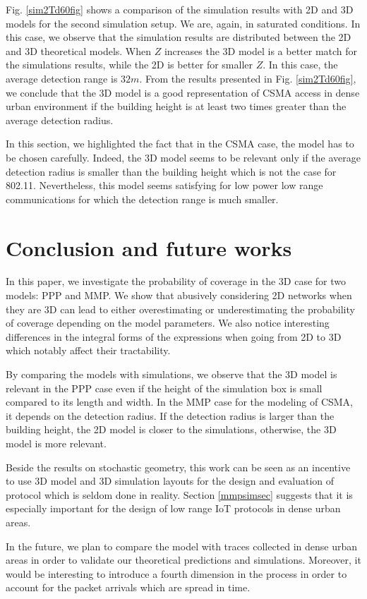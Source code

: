 \documentclass{sig-alternate-05-2015}
\begin{document}
Fig. \ref{sim2Td60fig} shows a comparison of the simulation results with 2D and 3D models for the second simulation setup. We are, again, in saturated conditions. In this case, we observe that the simulation results are distributed between the 2D and 3D theoretical models. When $Z$ increases the 3D model is a better match for the simulations results, while the 2D is better for smaller $Z$. In this case, the average detection range is $32m$. From the results presented in Fig. \ref{sim2Td60fig}, we conclude that the 3D model is a good representation of CSMA access in dense urban environment if the building height is at least two times greater than the average detection radius.

In this section, we highlighted the fact that in the CSMA case, the model has to be chosen carefully. Indeed, the 3D model seems to be relevant only if the average detection radius is smaller than the building height which is not the case for 802.11. Nevertheless, this model seems satisfying for low power low range communications for which the detection range is much smaller.

\section{Conclusion and future works}
\label{conclusec}

In this paper, we investigate the probability of coverage in the 3D case for two models: PPP and MMP. We show that abusively considering 2D networks when they are 3D can lead to either overestimating or underestimating the probability of coverage depending on the model parameters. We also notice interesting differences in the integral forms of the expressions when going from 2D to 3D which notably affect their tractability. 

By comparing the models with simulations, we observe that the 3D model is relevant in the PPP case even if the height of the simulation box is small compared to its length and width. In the MMP case for the modeling of CSMA, it depends on the detection radius. If the detection radius is larger than the building height, the 2D model is closer to the simulations, otherwise, the 3D model is more relevant.

Beside the results on stochastic geometry, this work can be seen as an incentive to use 3D model and 3D simulation layouts for the design and evaluation of protocol which is seldom done in reality. Section \ref{mmpsimsec} suggests that it is especially important for the design of low range IoT protocols in dense urban areas.

In the future, we plan to compare the model with traces collected in dense urban areas in order to validate our theoretical predictions and simulations. Moreover, it would be interesting to introduce a fourth dimension in the process in order to account for the packet arrivals which are spread in time.



   
\end{document}
